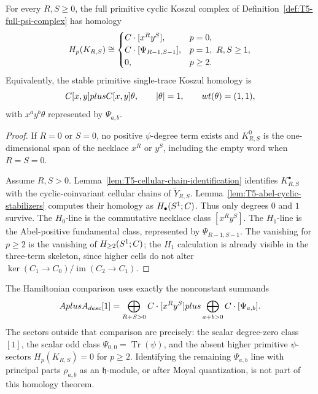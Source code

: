 \begin{thm}
  \label{thm:T5-full-primitive-psi-homology}
  For every \(R,S\ge0\), the full primitive cyclic Koszul complex of
  Definition~\ref{def:T5-full-psi-complex} has homology
  \[
    H_p(K_{R,S})\cong
    \begin{cases}
      C\cdot[x^Ry^S],&p=0,\\
      C\cdot[\Psi_{R-1,S-1}],&p=1,\ R,S\ge1,\\
      0,&p\ge2.
    \end{cases}
  \]
  Equivalently, the stable primitive single-trace Koszul homology is
  \[
    C[x,y]plusC[x,y]\theta,\qquad
    |\theta|=1,\qquad wt(\theta)=(1,1),
  \]
  with \(x^ay^b\theta\) represented by \(\Psi_{a,b}\).
\end{thm}

\begin{proof}
  If \(R=0\) or \(S=0\), no positive \(\psi\)-degree term exists and
  \(K^0_{R,S}\) is the one-dimensional span of the necklace \(x^R\) or
  \(y^S\), including the empty word when \(R=S=0\).

  Assume \(R,S>0\).  Lemma~\ref{lem:T5-cellular-chain-identification}
  identifies \(K^\bullet_{R,S}\) with the cyclic-coinvariant cellular
  chains of \(\widetilde Y_{R,S}\).  Lemma~\ref{lem:T5-abel-cyclic-stabilizers}
  computes their homology as \(H_\bullet(S^1;C)\).  Thus only degrees
  \(0\) and \(1\) survive.  The \(H_0\)-line is the commutative necklace
  class \([x^Ry^S]\).  The \(H_1\)-line is the Abel-positive fundamental
  class, represented by \(\Psi_{R-1,S-1}\).
  The vanishing for \(p\ge2\) is the vanishing of \(H_{\ge2}(S^1;C)\);
  the \(H_1\) calculation is already visible in the three-term skeleton,
  since higher cells do not alter
  \(\ker(C_1\to C_0)/\operatorname{im}(C_2\to C_1)\).
\end{proof}

\begin{thm}
  \label{thm:T5-hamiltonian-sector-extraction}
  The Hamiltonian comparison uses exactly the nonconstant summands
  \[
    Aplus A_{desc}[1]
      =
    \bigoplus_{R+S>0}C\cdot[x^Ry^S]
      plus
    \bigoplus_{a+b>0}C\cdot[\Psi_{a,b}].
  \]
  The sectors outside that comparison are precisely:
  the scalar degree-zero class \([1]\), the scalar odd class
  \(\Psi_{0,0}=\operatorname{Tr}(\psi)\), and the absent higher
  primitive \(\psi\)-sectors \(H_p(K_{R,S})=0\) for \(p\ge2\).
  Identifying the remaining \(\Psi_{a,b}\) line with principal parts
  \(\rho_{a,b}\) as an \(\mathfrak h\)-module, or after Moyal
  quantization, is not part of this homology theorem.
\end{thm}

